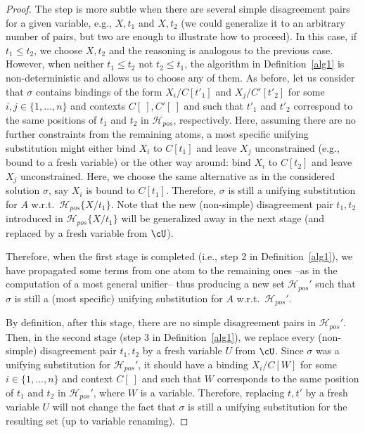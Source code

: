 \documentclass[fleqn]{tlp}
\newcommand{\Hpos}{\mathcal{H}_{\mathit{pos}}}
\begin{document}
\begin{appendix}
\begin{proof}
  The step is more subtle when there are several simple disagreement
  pairs for a given variable, e.g., $X,t_1$ and $X,t_2$ (we could
  generalize it to an arbitrary number of pairs, but two are enough to
  illustrate how to proceed). In this case, if $t_1\leq t_2$, we
  choose $X,t_2$ and the reasoning is analogous to the previous case.
  However, when neither $t_1\leq t_2$ not $t_2\leq t_1$, the algorithm
  in Definition~\ref{alg1} is non-deterministic and allows us to
  choose any of them. As before, let us consider that $\sigma$
  contains bindings of the form $X_i/C[t'_1]$ and $X_j/C'[t'_2]$ for
  some $i,j\in\{1,\ldots,n\}$ and contexts $C[~],C'[~]$ and such that
  $t'_1$ and $t'_2$ correspond to the same positions of $t_1$ and
  $t_2$ in $\Hpos$, respectively. Here, assuming there are no further
  constraints from the remaining atoms, a most specific unifying
  substitution might either bind $X_i$ to $C[t_1]$ and leave $X_j$
  unconstrained (e.g., bound to a fresh variable) or the other way
  around: bind $X_i$ to $C[t_2]$ and leave $X_j$ unconstrained. Here,
  we choose the same alternative as in the considered solution
  $\sigma$, say $X_i$ is bound to $C[t_1]$. Therefore, $\sigma$ is
  still a unifying substitution for $A$ w.r.t.\ $\Hpos\{X/t_1\}$. Note
  that the new (non-simple) disagreement pair $t_1,t_2$ introduced in
  $\Hpos\{X/t_1\}$ will be generalized away in the next stage (and
  replaced by a fresh variable from $\cU$).
  
  Therefore, when the first stage is completed (i.e., step 2 in
  Definition~\ref{alg1}), we have propagated some terms from one atom to
  the remaining ones --as in the computation of a most general
  unifier-- thus producing a new set $\Hpos'$ such that $\sigma$ is
  still a (most specific) unifying substitution for $A$ w.r.t.\
  $\Hpos'$.

  By definition, after this stage, there are no simple disagreement
  pairs in $\Hpos'$. 
  Then, in the second stage (step 3 in Definition~\ref{alg1}), we replace
  every (non-simple) disagreement pair $t_1,t_2$ by a fresh variable
  $U$ from $\cU$. Since $\sigma$ was a unifying substitution for
  $\Hpos'$, it should have a binding $X_i/C[W]$ for some
  $i\in\{1,\ldots,n\}$ and context $C[~]$ and such that $W$
  corresponds to the same position of $t_1$ and $t_2$ in $\Hpos'$,
  where $W$ is a variable.  Therefore, replacing $t,t'$ by a fresh
  variable $U$ will not change the fact that $\sigma$ is still a
  unifying substitution for the resulting set (up to variable
  renaming).


\end{proof}
\end{appendix}
\end{document}
